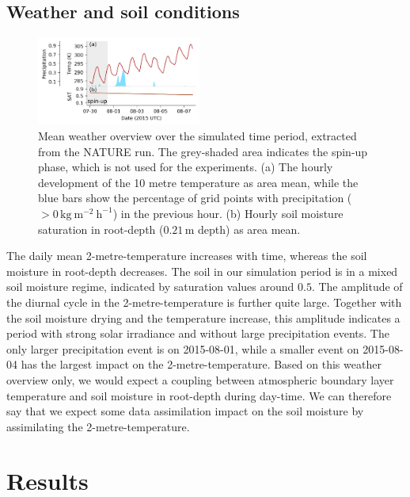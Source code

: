 \documentclass[hess, manuscript]{copernicus}
\begin{document}
\subsection{Weather and soil conditions}

\begin{figure}
	\includegraphics[width=0.48\textwidth]{figures/fig_03_overview.png}
	\caption{
		Mean weather overview over the simulated time period, extracted from the NATURE run.
		The grey-shaded area indicates the spin-up phase, which is not used for the experiments.
		(a) The hourly development of the 10 metre temperature as area mean, while the blue bars show the percentage of grid points with precipitation ($> 0\,\text{kg}~\text{m}^{-2}~\text{h}^{-1}$) in the previous hour.
		(b) Hourly soil moisture saturation in root-depth ($0.21\,\text{m}$ depth) as area mean.
	}
	\label{fig:test_case_overview}
\end{figure}

The daily mean 2-metre-temperature increases with time, whereas the soil moisture in root-depth decreases.
The soil in our simulation period is in a mixed soil moisture regime, indicated by saturation values around $0.5$.
The amplitude of the diurnal cycle in the 2-metre-temperature is further quite large.
Together with the soil moisture drying and the temperature increase, this amplitude indicates a period with strong solar irradiance and without large precipitation events.
The only larger precipitation event is on 2015-08-01, while a smaller event on 2015-08-04 has the largest impact on the 2-metre-temperature.
Based on this weather overview only, we would expect a coupling between atmospheric boundary layer temperature and soil moisture in root-depth during day-time.
We can therefore say that we expect some data assimilation impact on the soil moisture by assimilating the 2-metre-temperature.


\section{Results}\label{sec:results}
\end{document}
